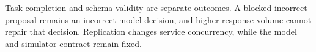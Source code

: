 Task completion and schema validity are separate outcomes. A blocked incorrect proposal remains an incorrect model decision, and higher response volume cannot repair that decision. Replication changes service concurrency, while the model and simulator contract remain fixed.
